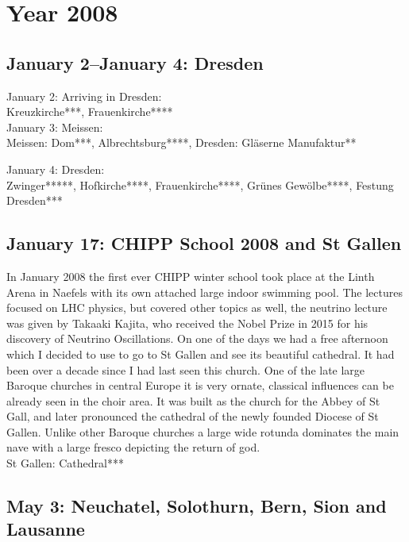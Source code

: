 \chapter{Year 2008}
\label{2008}

\section{January 2--January 4: Dresden}
\label{2008:Dresden}

January 2: Arriving in Dresden:\\

Kreuzkirche***, Frauenkirche****\\

January 3: Meissen:\\

Meissen: Dom***, Albrechtsburg****, Dresden: Gl\"aserne Manufaktur**

January 4: Dresden:\\

Zwinger*****, Hofkirche****, Frauenkirche****, Gr\"unes Gew\"olbe****, Festung Dresden***

\section{January 17: CHIPP School 2008 and St Gallen}
\label{2008:StGallen}

In January 2008 the first ever CHIPP winter school took place at the Linth Arena in Naefels with its own attached large indoor swimming pool. The lectures focused on LHC physics, but covered other topics as well, the neutrino lecture was given by Takaaki Kajita, who received the Nobel Prize in 2015 for his discovery of Neutrino Oscillations. On one of the days we had a free afternoon which I decided to use to go to St Gallen and see its beautiful cathedral. It had been over a decade since I had last seen this church. One of the late large Baroque churches in central Europe it is very ornate, classical influences can be already seen in the choir area. It was built as the church for the Abbey of St Gall, and later pronounced the cathedral of the newly founded Diocese of St Gallen. Unlike other Baroque churches a large wide rotunda dominates the main nave with a large fresco depicting the return of god.\\

St Gallen: Cathedral***\\

\section{May 3: Neuchatel, Solothurn, Bern, Sion and Lausanne}
\label{2008:Swisstrip}

